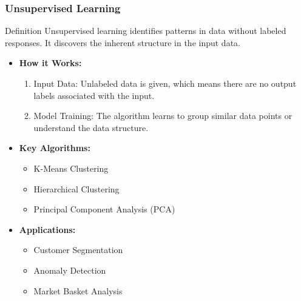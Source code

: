 \documentclass[aspectratio=169]{beamer}
\begin{document}
\begin{frame}[fragile]
    \frametitle{Unsupervised Learning}
    \begin{block}{Definition}
        Unsupervised learning identifies patterns in data without labeled responses. It discovers the inherent structure in the input data.
    \end{block}
    
    \begin{itemize}
        \item \textbf{How it Works:}
        \begin{enumerate}
            \item Input Data: Unlabeled data is given, which means there are no output labels associated with the input.
            \item Model Training: The algorithm learns to group similar data points or understand the data structure.
        \end{enumerate}
        
        \item \textbf{Key Algorithms:}
        \begin{itemize}
            \item K-Means Clustering
            \item Hierarchical Clustering
            \item Principal Component Analysis (PCA)
        \end{itemize}
        
        \item \textbf{Applications:}
        \begin{itemize}
            \item Customer Segmentation
            \item Anomaly Detection
            \item Market Basket Analysis
        \end{itemize}
    \end{itemize}
\end{frame}
\end{document}
